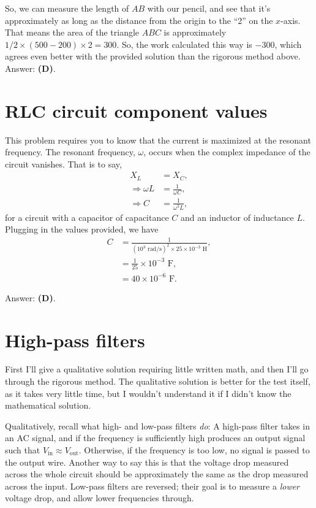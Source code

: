 \documentclass[11pt]{paper}
\newcommand{\answer}[1]{Answer: \textbf{(#1)}.}
\begin{document}
So, we can measure the length of $AB$ with our pencil, and see that it's approximately as long as the distance from the origin to the ``2'' on the $x$-axis.  That means the area of the triangle $ABC$ is approximately $1/2 \times \left(500-200\right) \times 2 = 300$.  So, the work calculated this way is $-300$, which agrees even better with the provided solution than the rigorous method above.\\

\answer{D}
\section{RLC circuit component values}
This problem requires you to know that the current is maximized at the resonant frequency.  The resonant frequency, $\omega$, occurs when the complex impedance of the circuit vanishes.  That is to say,
\begin{align}
X_L &= X_C,\\
\Rightarrow \omega L &= \frac{1}{\omega C},\\
\Rightarrow C &= \frac{1}{\omega^2 L},
\end{align}
for a circuit with a capacitor of capacitance $C$ and an inductor of inductance $L$.  Plugging in the values provided, we have
\begin{align}
C &= \frac{1}{(10^3 \text{ rad}/\text{s})^2 \times 25 \times 10^{-3} \text{ H}},\\
&= \frac{1}{25} \times 10^{-3} \text{ F},\\
&= 40 \times 10^{-6} \text{ F}.
\end{align}

\answer{D}

\section{High-pass filters}
First I'll give a qualitative solution requiring little written math, and then I'll go through the rigorous method.  The qualitative solution is better for the test itself, as it takes very little time, but I wouldn't understand it if I didn't know the mathematical solution.

Qualitatively, recall what high- and low-pass filters \emph{do}: A high-pass filter takes in an AC signal, and if the frequency is sufficiently high produces an output signal such that $V_\text{in} \approx V_\text{out}$.  Otherwise, if the frequency is too low, no signal is passed to the output wire.  Another way to say this is that the voltage drop measured across the whole circuit should be approximately the same as the drop measured across the input.  Low-pass filters are reversed; their goal is to measure a \emph{lower} voltage drop, and allow lower frequencies through.
\end{document}

